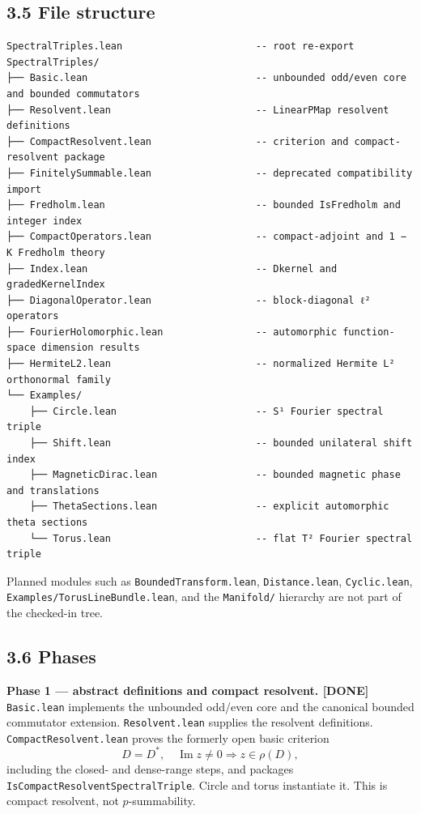 \documentclass[
  11pt,
]{article}
\begin{document}
\subsection{3.5 File structure}\label{file-structure}

\begin{verbatim}
SpectralTriples.lean                       -- root re-export
SpectralTriples/
├── Basic.lean                             -- unbounded odd/even core and bounded commutators
├── Resolvent.lean                         -- LinearPMap resolvent definitions
├── CompactResolvent.lean                  -- criterion and compact-resolvent package
├── FinitelySummable.lean                  -- deprecated compatibility import
├── Fredholm.lean                          -- bounded IsFredholm and integer index
├── CompactOperators.lean                  -- compact-adjoint and 1 − K Fredholm theory
├── Index.lean                             -- Dkernel and gradedKernelIndex
├── DiagonalOperator.lean                  -- block-diagonal ℓ² operators
├── FourierHolomorphic.lean                -- automorphic function-space dimension results
├── HermiteL2.lean                         -- normalized Hermite L² orthonormal family
└── Examples/
    ├── Circle.lean                        -- S¹ Fourier spectral triple
    ├── Shift.lean                         -- bounded unilateral shift index
    ├── MagneticDirac.lean                 -- bounded magnetic phase and translations
    ├── ThetaSections.lean                 -- explicit automorphic theta sections
    └── Torus.lean                         -- flat T² Fourier spectral triple
\end{verbatim}

Planned modules such as \texttt{BoundedTransform.lean},
\texttt{Distance.lean}, \texttt{Cyclic.lean},
\texttt{Examples/TorusLineBundle.lean}, and the \texttt{Manifold/}
hierarchy are not part of the checked-in tree.

\subsection{3.6 Phases}\label{phases}

\textbf{Phase 1 --- abstract definitions and compact resolvent. [DONE]}
\texttt{Basic.lean} implements the unbounded odd/even core and the
canonical bounded commutator extension. \texttt{Resolvent.lean} supplies
the resolvent definitions. \texttt{CompactResolvent.lean} proves the
formerly open basic criterion
\[
D=D^*,\quad \operatorname{Im}z\ne0 \Longrightarrow z\in\rho(D),
\]
including the closed- and dense-range steps, and packages
\texttt{IsCompactResolventSpectralTriple}. Circle and torus instantiate
it. This is compact resolvent, not \(p\)-summability.
\end{document}
